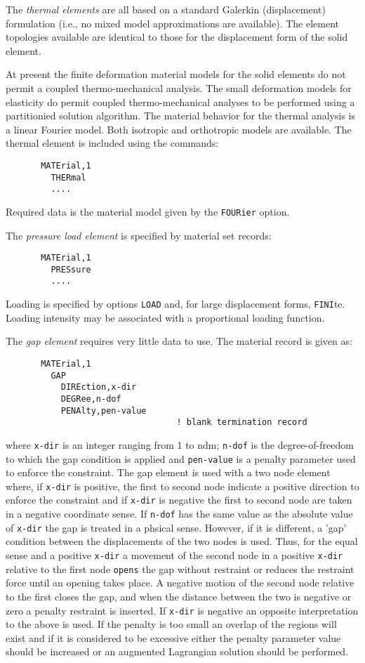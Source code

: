 The {\it thermal elements} are all based on a standard Galerkin (displacement)
formulation (i.e., no mixed model approximations are available).  The
element topologies available are identical to those for the displacement
form of the solid element.

At present the finite deformation material
models for the solid elements do not permit a coupled thermo-mechanical
analysis.  The small deformation models for elasticity do permit coupled
thermo-mechanical analyses to be performed using a partitionied solution
algorithm.  The material behavior for the thermal analysis is a linear
Fourier model.  Both isotropic and orthotropic models are available.
The thermal element is included using the commands:
\begin{verbatim}
       MATErial,1
         THERmal
		 ....
\end{verbatim}
Required data is the material model given by the \texttt{FOURier} option.

The {\it pressure load element} is specified by material set records:
\begin{verbatim}
       MATErial,1
         PRESsure
		 ....
\end{verbatim}
Loading is specified by options \texttt{LOAD} and, for large displacement
forms, \texttt{FINI}te.  Loading intensity may be associated with a proportional
loading function.

The {\it gap element} requires very little data to use.  The material
record is given as:
\begin{verbatim}
       MATErial,1
         GAP
           DIREction,x-dir
           DEGRee,n-dof
           PENAlty,pen-value
                                  ! blank termination record
\end{verbatim}
where \texttt{x-dir} is an integer ranging from 1 to ndm;
\texttt{n-dof} is the degree-of-freedom to which the gap condition is
applied and \texttt{pen-value} is a penalty parameter used to enforce
the constraint.
The gap element is used with a two node element where, if \texttt{x-dir}
is positive, the first to second node indicate
a positive direction to enforce the constraint and if \texttt{x-dir} is
negative the first to second node are taken in a negative coordinate
sense.  If \texttt{n-dof} has the same value as the absolute value of
\texttt{x-dir} the gap is treated in a phsical sense.  However, if
it is different, a 'gap' condition between the displacements of the
two nodes is used.  Thus, for the equal sense and a positive \texttt{x-dir}
a movement of the
second node in a positive \texttt{x-dir} relative to the first node
\texttt{opens} the gap without restraint or reduces the restraint force until
an opening takes place.  A negative motion of the second node relative
to the first closes the gap, and when the distance between the two is
negative or zero a penalty restraint is inserted.  If \texttt{x-dir} is
negative an opposite interpretation to the above is used.  If the penalty is
too small an overlap of the regions will exist and if it is considered
to be excessive either the penalty parameter value
should be increased or an augmented Lagrangian solution should be performed.

